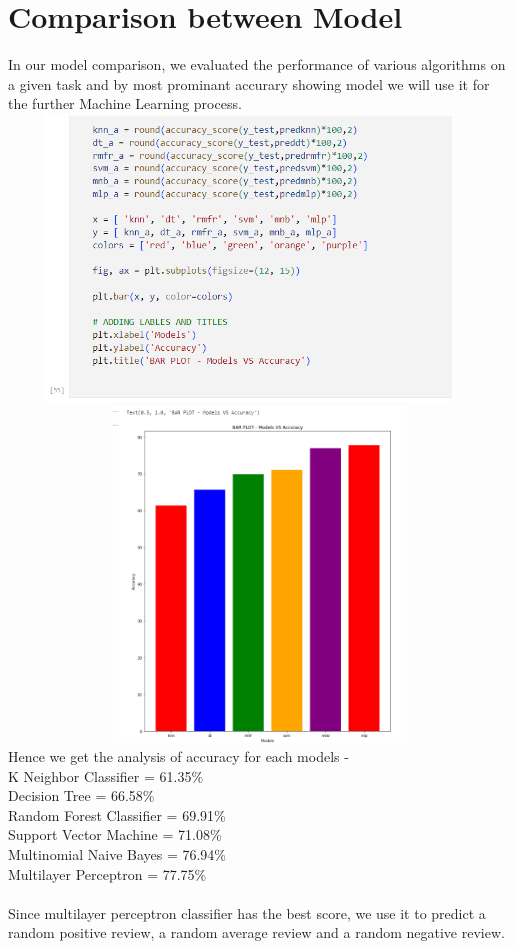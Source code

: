 \documentclass[a4paper, 12pt]{report}
\begin{document}
\section{Comparison between Model}
In our model comparison, we evaluated the performance of various algorithms on a given task and by most prominant accurary showing model we will use it for the further Machine Learning process.\\
\includegraphics[height=3in,width=5in]{22}\\
\includegraphics[height=3.5in,width=6in]{23}\\
Hence we get the analysis of accuracy for each models - \\
K Neighbor Classifier = 61.35\% \\
Decision Tree = 66.58\% \\
Random Forest Classifier = 69.91\% \\
Support Vector Machine  = 71.08\% \\
Multinomial Naive Bayes = 76.94\% \\
Multilayer Perceptron = 77.75\% \\
\\
Since multilayer perceptron classifier has the best score, we use it to predict a random positive review, a random average review and a random negative review.
\end{document}
